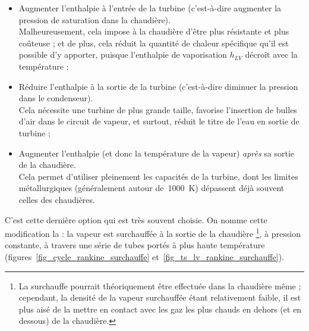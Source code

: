 		\begin{itemize}
			\item Augmenter l’enthalpie à l’entrée de la turbine (c’est-à-dire augmenter la pression de saturation dans la chaudière). \\
			Malheureusement, cela impose à la chaudière d’être plus résistante et plus coûteuse ; et de plus, cela réduit la quantité de chaleur spécifique qu’il est possible d’y apporter, puisque l’enthalpie de vaporisation $h_{LV}$ décroît avec la température ;

			\item Réduire l’enthalpie à la sortie de la turbine (c’est-à-dire diminuer la pression dans le condenseur). \\
			Cela nécessite une turbine de plus grande taille,  favorise l’insertion de bulles d’air dans le circuit de vapeur, et surtout, réduit le titre de l’eau en sortie de turbine ;

			\item Augmenter l’enthalpie (et donc la température de la vapeur) \emph{après} sa sortie de la chaudière.\\
			Cela permet  d’utiliser pleinement les capacités de la turbine, dont les limites métallurgiques (généralement autour de~\SI{1000}{\kelvin}) dépassent déjà souvent celles des chaudières.
		\end{itemize}

		C’est cette dernière option qui est très souvent choisie. On nomme cette modification la  : la vapeur est surchauffée à la sortie de la chaudière%
		\footnote{La surchauffe pourrait théoriquement être effectuée dans la chaudière même ; cependant, la densité de la vapeur surchauffée étant relativement faible, il est plus aisé de la mettre en contact avec les gaz les plus chauds en dehors (et en dessous) de la chaudière.}, à pression constante, à travers une série de tubes portés à plus haute température (figures~\ref{fig_cycle_rankine_surchauffe} et~\ref{fig_ts_lv_rankine_surchauffe}).

